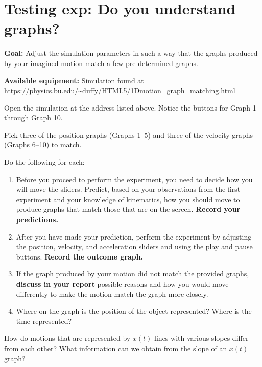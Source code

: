 \section{Testing exp: Do you understand graphs?}

\textbf{Goal:} Adjust the simulation parameters in such a way that the graphs produced by your imagined motion match a few pre-determined graphs.

\textbf{Available equipment:} Simulation found at \url{https://physics.bu.edu/~duffy/HTML5/1Dmotion_graph_matching.html} 

\begin{steps}
	
	\item Open the simulation at the address listed above. Notice the buttons for Graph 1 through Graph 10.
	
	\item Pick three of the position graphs (Graphs 1--5) and three of the velocity graphs (Graphs 6--10) to match.
	
	\item Do the following for each:
	\begin{enumerate}
		\item Before you proceed to perform the experiment, you need to decide how you will move the sliders. Predict, based on your observations from the first experiment and your knowledge of kinematics, how you should move to produce graphs that match those that are on the screen. \textbf{Record your predictions.}
		
		\item After you have made your prediction, perform the experiment by adjusting the position, velocity, and acceleration sliders and using the play and pause buttons. \textbf{Record the outcome graph.}
		
		\item If the graph produced by your motion did not match the provided graphs, \textbf{discuss in your report} possible reasons and how you would move differently to make the motion match the graph more closely.
		
		\item Where on the graph is the position of the object represented?  Where is the time represented?
	\end{enumerate}
	
	\item How do motions that are represented by $x(t)$ lines with various slopes differ from each other? What information can we obtain from the slope of an $x(t)$ graph?
	
\end{steps}

